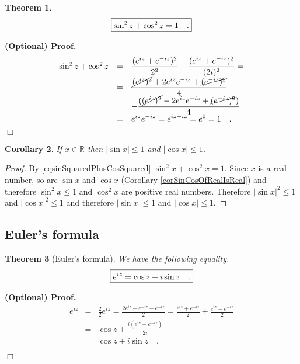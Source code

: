 \documentclass[12pt]{book}
\newcommand{\importantFormula}[1]{\begin{equation} \boxed{#1} \end{equation}}
\newenvironment{proofOptional}[1][]{ \noindent \textbf{(Optional) Proof#1.}}{$\Box$\medskip}
\newtheorem{theorem}{Theorem}[section]
\newtheorem{corollary}[theorem]{Corollary}
\begin{document}
\begin{theorem}
\importantFormula{\label{eqsinSquaredPlusCosSquared}
\sin^2 z +\cos^2 z= 1\quad .
}

\end{theorem}
\begin{proofOptional}
\begin{equation*}
\begin{array}{rcl}
\sin^2 z +\cos^2 z&=&\displaystyle  \frac{(e^{iz} + e^{-iz})^2 }{2^2} + \frac{(e^{iz}+e^{-iz})^2}{(2i)^2}=\\
&=&\displaystyle \frac{ \cancel{(e^{iz})^2} + 2 e^{iz}e^{-iz} + \cancel{(e^{-iz})^2}}{4} \\
&&\displaystyle -\frac{(\cancel{(e^{iz})^2}-2e^{iz}e^{-iz} + \cancel{(e^{-iz})^2})}{4} \\
&=& \displaystyle e^{iz}e^{-iz}= e^{iz-iz}=e^0=1\quad .
\end{array}
\end{equation*}
\end{proofOptional}
\begin{corollary}
If $x\in \mathbb R$ then $|\sin x|\leq 1$ and $|\cos x| \leq 1$.
\end{corollary}
\begin{proof}
By  \eqref{eqsinSquaredPlusCosSquared} $\sin^2 x+\cos ^2 x=1$. Since $x$ is a real number, so are $\sin x$ and $\cos x$ (Corollary \ref{corSinCosOfRealIsReal}) and therefore $\sin^2x\leq 1$ and $\cos^2 x$ are positive real numbers. Therefore  $|\sin x|^2\leq 1$ and $|\cos x|^2\leq 1$ and therefore $|\sin x|\leq 1$ and $|\cos x|\leq 1$.
\end{proof}
\subsection{Euler's formula}
\begin{theorem}[Euler's formula]
We have the following equality.
\importantFormula{\label{eqEulerExp}
e^{iz}= \cos z+ i\sin z \quad .
}
\end{theorem}
\begin{proofOptional}
\[
\begin{array}{rcl}
\displaystyle e^{iz}&=&\displaystyle  \frac{2}{2}e^{iz}= \frac{2e^{iz} + e^{-iz} - e^{-iz}}{2} = \frac{e^{iz}+e^{-iz}}2 +\frac{e^{iz}-e^{-iz}}2\\
&=&\displaystyle  \cos z + \frac{i(e^{iz}-e^{-iz})}{2i}\\
&=& \displaystyle \cos z+i \sin z\quad .
\end{array}
\]

\end{proofOptional}
\end{document}
